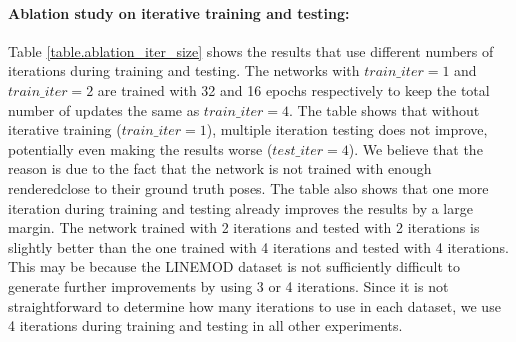 \documentclass[twocolumn]{svjour3}
\newcommand{\rend}[0]{rendered}
\begin{document}
\paragraph{Ablation study on iterative training and testing:}%
%
Table \ref{table.ablation_iter_size} shows the results that use different numbers of iterations during training and testing. The networks with $train\_iter=1$ and $train\_iter=2$ are trained with 32 and 16 epochs respectively to keep the total number of updates the same as $train\_iter=4$. The table shows that without iterative training ($train\_iter=1$), multiple iteration testing does not improve, potentially even making the results worse ($test\_iter=4$). We believe that the reason is due to the fact that the network is not trained with enough \rend\poses close to their ground truth poses. The table also shows that one more iteration during training and testing already improves the results by a large margin. The network trained with 2 iterations and tested with 2 iterations is slightly better than the one trained with 4 iterations and tested with 4 iterations. This may be because the LINEMOD dataset is not sufficiently difficult to generate further improvements by using 3 or 4 iterations. Since it is not straightforward to determine how many iterations to use in each dataset, we use 4 iterations during training and testing in all other experiments.
\end{document}
